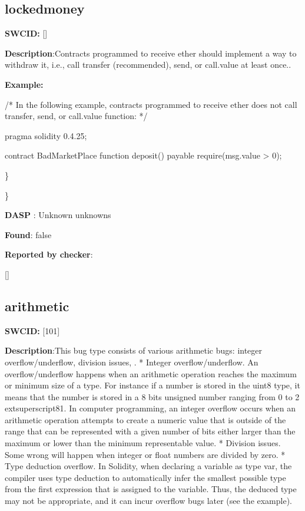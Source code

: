 \documentclass{article}
\begin{document}
\subsection{locked{\textunderscore}money} 
\textbf{SWC{\textunderscore}ID:} []

\textbf{Description}:Contracts programmed to receive ether should implement a way to withdraw it, i.e., call transfer (recommended), send, or call.value at least once..


\textbf{Example:} 
\begin{ffcode} 

/* In the following example, contracts programmed to receive ether does not call transfer, send, or call.value function: */ 

pragma solidity 0.4.25;

contract BadMarketPlace {
    function deposit() payable {
        require(msg.value > 0);
    }
}

\end{ffcode} 
\} 

\} 

\textbf{DASP} : Unknown unknowns

\textbf{Found}: false

\textbf{Reported by checker}: 
\begin{ffcode} 

[]
\end{ffcode} 
\subsection{arithmetic} 
\textbf{SWC{\textunderscore}ID:} [101]

\textbf{Description}:This bug type consists of various arithmetic bugs: integer overflow/underflow, division issues, .
* Integer overflow/underflow. An overflow/underflow happens when an arithmetic operation reaches the maximum or minimum size of a type. For instance if a number is stored in the uint8 type, it means that the number is stored in a 8 bits unsigned number ranging from 0 to 2{	extsuperscript}8{\textendash}1. In computer programming, an integer overflow occurs when an arithmetic operation attempts to create a numeric value that is outside of the range that can be represented with a given number of bits either larger than the maximum or lower than the minimum representable value.
* Division issues. Some wrong will happen when integer or float numbers are divided by zero.
* Type deduction overflow. In Solidity, when declaring a variable as type var, the compiler uses type deduction to automatically infer the smallest possible type from the first expression that is assigned to the variable. Thus, the deduced type may not be appropriate, and it can incur overflow bugs later (see the example).
\end{document}
